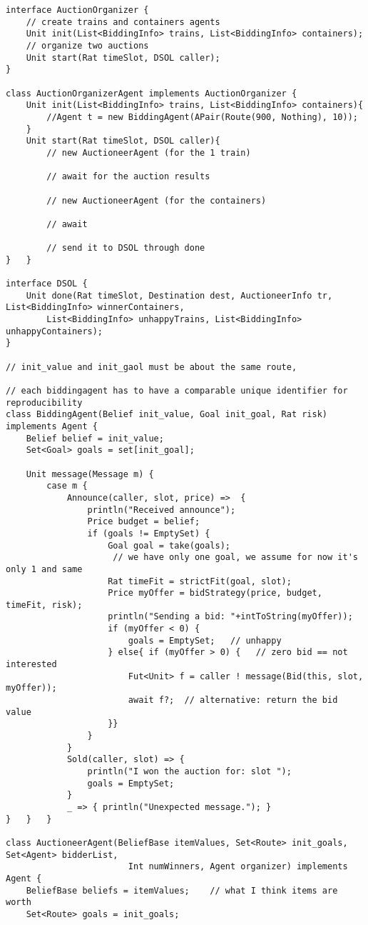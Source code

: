 \documentclass[runningheads,a4paper]{llncs}
\begin{document}
\begin{lstlisting}
interface AuctionOrganizer {
	// create trains and containers agents
	Unit init(List<BiddingInfo> trains, List<BiddingInfo> containers);
	// organize two auctions 
	Unit start(Rat timeSlot, DSOL caller);
}

class AuctionOrganizerAgent implements AuctionOrganizer {
	Unit init(List<BiddingInfo> trains, List<BiddingInfo> containers){
		//Agent t = new BiddingAgent(APair(Route(900, Nothing), 10));
	}
	Unit start(Rat timeSlot, DSOL caller){
		// new AuctioneerAgent (for the 1 train)
		
		// await for the auction results
		
		// new AuctioneerAgent (for the containers)
		
		// await
		
		// send it to DSOL through done
}	}

interface DSOL {
	Unit done(Rat timeSlot, Destination dest, AuctioneerInfo tr, List<BiddingInfo> winnerContainers, 
		List<BiddingInfo> unhappyTrains, List<BiddingInfo> unhappyContainers);
}

// init_value and init_gaol must be about the same route, 

// each biddingagent has to have a comparable unique identifier for reproducibility
class BiddingAgent(Belief init_value, Goal init_goal, Rat risk) implements Agent {
	Belief belief = init_value;
	Set<Goal> goals = set[init_goal];
	
	Unit message(Message m) {
		case m {
			Announce(caller, slot, price) =>  {
				println("Received announce");
				Price budget = belief;
				if (goals != EmptySet) {
					Goal goal = take(goals);  
					 // we have only one goal, we assume for now it's only 1 and same
					Rat timeFit = strictFit(goal, slot);
					Price myOffer = bidStrategy(price, budget, timeFit, risk);
					println("Sending a bid: "+intToString(myOffer));
					if (myOffer < 0) {
						goals = EmptySet;   // unhappy
					} else{ if (myOffer > 0) {   // zero bid == not interested
						Fut<Unit> f = caller ! message(Bid(this, slot, myOffer));
						await f?;  // alternative: return the bid value
					}}
				}
			}
			Sold(caller, slot) => {
				println("I won the auction for: slot "); 
				goals = EmptySet;
			}
			_ => { println("Unexpected message."); }
}	}	}

class AuctioneerAgent(BeliefBase itemValues, Set<Route> init_goals, Set<Agent> bidderList, 
						Int numWinners, Agent organizer) implements Agent {
	BeliefBase beliefs = itemValues;	// what I think items are worth
	Set<Route> goals = init_goals;
	

\end{lstlisting}
\end{document}
